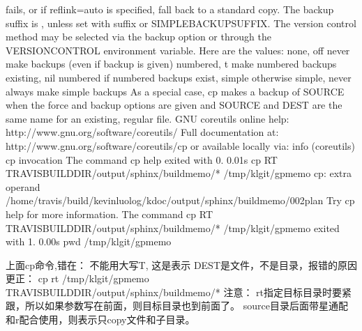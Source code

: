 \documentclass[letterpaper,12pt,english]{sphinxmanual}
\begin{document}
\begin{sphinxVerbatim}[commandchars=\\\{\}]
fails, or if \PYGZhy{}\PYGZhy{}reflink=auto is specified, fall back to a standard copy.
The backup suffix is \PYGZsq{}\PYGZti{}\PYGZsq{}, unless set with \PYGZhy{}\PYGZhy{}suffix or SIMPLE\PYGZus{}BACKUP\PYGZus{}SUFFIX.
The version control method may be selected via the \PYGZhy{}\PYGZhy{}backup option or through
the VERSION\PYGZus{}CONTROL environment variable.  Here are the values:
  none, off       never make backups (even if \PYGZhy{}\PYGZhy{}backup is given)
  numbered, t     make numbered backups
  existing, nil   numbered if numbered backups exist, simple otherwise
  simple, never   always make simple backups
As a special case, cp makes a backup of SOURCE when the force and backup
options are given and SOURCE and DEST are the same name for an existing,
regular file.
GNU coreutils online help: \PYGZlt{}http://www.gnu.org/software/coreutils/\PYGZgt{}
Full documentation at: \PYGZlt{}http://www.gnu.org/software/coreutils/cp\PYGZgt{}
or available locally via: info \PYGZsq{}(coreutils) cp invocation\PYGZsq{}
The command \PYGZdq{}cp \PYGZhy{}\PYGZhy{}help\PYGZdq{} exited with 0.
0.01s\PYGZdl{} \PYGZbs{}cp \PYGZhy{}RT \PYGZdl{}TRAVIS\PYGZus{}BUILD\PYGZus{}DIR/output/sphinx/build\PYGZhy{}memo/* /tmp/klgit/gp\PYGZhy{}memo
cp: extra operand \PYGZsq{}/home/travis/build/kevinluolog/kdoc/output/sphinx/build\PYGZhy{}memo/002plan\PYGZsq{}
Try \PYGZsq{}cp \PYGZhy{}\PYGZhy{}help\PYGZsq{} for more information.
The command \PYGZdq{}\PYGZbs{}cp \PYGZhy{}RT \PYGZdl{}TRAVIS\PYGZus{}BUILD\PYGZus{}DIR/output/sphinx/build\PYGZhy{}memo/* /tmp/klgit/gp\PYGZhy{}memo\PYGZdq{} exited with 1.
0.00s\PYGZdl{} pwd
/tmp/klgit/gp\PYGZhy{}memo

上面cp命令,错在：
\PYGZhy{} 不能用大写T, 这是表示 DEST是文件，不是目录，报错的原因
更正：
cp \PYGZhy{}rt /tmp/klgit/gp\PYGZhy{}memo \PYGZdl{}TRAVIS\PYGZus{}BUILD\PYGZus{}DIR/output/sphinx/build\PYGZhy{}memo/*
注意： \PYGZhy{}rt指定目标目录时要紧跟，所以如果参数写在前面，则目标目录也到前面了。
source目录后面带星通配和\PYGZhy{}r配合使用，则表示只copy文件和子目录。
\end{sphinxVerbatim}
\end{document}
